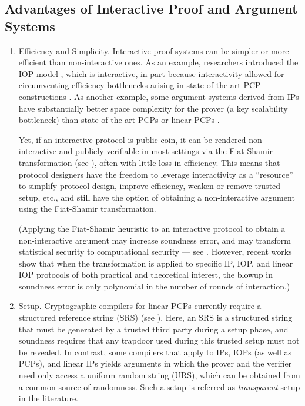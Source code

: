 \subsection{Advantages of Interactive Proof and Argument Systems}
\label{advantagesofinteraction}
\begin{enumerate}[label=\alph*.]
\item \underline{Efficiency and Simplicity.} 
Interactive proof systems can be simpler or more efficient than non-interactive ones.
As an example, researchers introduced the IOP model \cite{2016:tcc:IOPs, 2016:stoc:Constant-round-Interactive-Proofs-for-Delegating-Computation}, which is interactive, in part because interactivity allowed for circumventing efficiency bottlenecks arising
in state of the art PCP constructions \cite{2013:STOC:concrete-efficiency-PCPs}. 
As another example, some argument systems derived from IPs \cite{2018:SP:Doubly-efficient-zkSNARKs-without-trusted-setup, 2019:crypto:libra}
have substantially better space complexity for the prover (a key scalability bottleneck) than state of the art PCPs \cite{2013:STOC:concrete-efficiency-PCPs} or linear PCPs \cite{2013:QSPs-and-succinct-NIZKs-without-PCPs, 2016:Eurocrypt:On-the-Size-of-Pairing-Based-Non-interactive-Arguments}. 

Yet, if an interactive protocol is public coin, it can be rendered non-interactive and publicly verifiable in most settings via the Fiat-Shamir transformation (see ), often with little loss in efficiency. This means that protocol designers have the freedom to leverage interactivity as a ``resource'' to simplify protocol design, improve efficiency, weaken or remove trusted setup, etc., and still have the option of obtaining a non-interactive argument using the Fiat-Shamir transformation.

(Applying the Fiat-Shamir heuristic to an interactive protocol to obtain a non-interactive argument may increase soundness error, and may transform statistical security to computational security --- see .
However, recent works \cite{2016:tcc:IOPs, 2019:STC:Fiat-Shamir-from-practice-to-theory} show that when the transformation is applied to specific IP, IOP, and linear IOP protocols of both practical and theoretical interest, the blowup in soundness error is only polynomial in the number of rounds of interaction.) 


\item \underline{Setup.} 
Cryptographic compilers for linear PCPs currently require a structured reference string (SRS) (see ). 
Here, an SRS is a structured string that must be generated by a trusted third party during a setup phase, and soundness requires that any
trapdoor used during this trusted setup must not be revealed. In contrast, some compilers that apply to IPs, IOPs (as well as PCPs), and linear IPs
yields arguments in which the prover and the verifier need only access a uniform random string (URS), which can be obtained
from a common source of randomness. Such a setup is referred as \emph{transparent} setup in the literature.


\end{enumerate}
